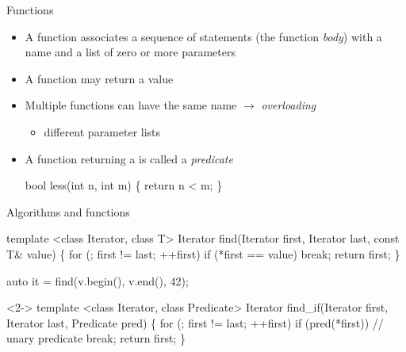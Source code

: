 \begin{frame}[fragile]{Functions}

  \begin{itemize}
  \item A function associates a sequence of statements (the function
    \textit{body}) with a name and a list of zero or more parameters

  \item A function may return a value
  \item Multiple functions can have the same name $\rightarrow$
    \textit{overloading}
    \begin{itemize}
    \item different parameter lists
    \end{itemize}

  \item<2-> A function returning a  is called a \textit{predicate}
    \begin{codeblock}
bool less(int n, int m) \{ return n < m; \}\end{codeblock}

  \end{itemize}

\end{frame}

\begin{frame}[fragile]{Algorithms and functions}

  \begin{codeblock}{\tiny
template <class Iterator, class T>
Iterator find(Iterator first, Iterator last, \alert{const T\& value})
\{
  for (; first != last; ++first)
    if (\alert{*first == value})
      break;
  return first;
\}

auto it = find(v.begin(), v.end(), 42);}\end{codeblock}

  \begin{codeblock}<2->
template <class Iterator, class Predicate>
Iterator find\alert{_if}(Iterator first, Iterator last, \alert{Predicate pred})
\{
  for (; first != last; ++first)
    if (\alert{pred(*first)})         // unary predicate
      break;
  return first;
\}


\end{codeblock}

\end{frame}

